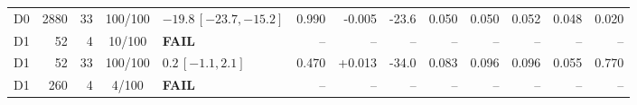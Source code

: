 \begin{longtable}{crrcp{33mm}rrrrrrrr}
D0 & 2880 & 33 & 100/100 & \(-19.8\,[-23.7,-15.2]\) & 0.990 & -0.005 & -23.6 & 0.050 & 0.050 & 0.052 & 0.048 & 0.020\\
D1 & 52 & 4 & 10/100 & \textbf{FAIL} & -- & -- & -- & -- & -- & -- & -- & --\\
D1 & 52 & 33 & 100/100 & \(0.2\,[-1.1,2.1]\) & 0.470 & +0.013 & -34.0 & 0.083 & 0.096 & 0.096 & 0.055 & 0.770\\
D1 & 260 & 4 & 4/100 & \textbf{FAIL} & -- & -- & -- & -- & -- & -- & -- & --\\

\end{longtable}
